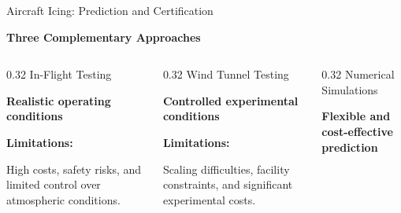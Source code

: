 \begin{frame}{Aircraft Icing: Prediction and Certification}

\vspace{-0.15cm}

\noindent{}

\vspace{0.05cm}
\vspace{0.25cm}
{\centering\color{champsBlue}\bfseries\large Three Complementary Approaches\par}
\vspace{0.1cm}

\vspace{-0.05cm}

\begin{columns}[T,onlytextwidth]

\begin{column}{0.32\textwidth}
\introCard
    {}
    {In-Flight Testing}
    {
    \textbf{Realistic operating conditions}

    \vspace{0.1cm}

    \textcolor{red!70!black}{\textbf{Limitations:}}

    High costs, safety risks, and
    limited control over atmospheric
    conditions.
    }
\end{column}

\begin{column}{0.32\textwidth}
\introCard
    {}
    {Wind Tunnel Testing}
    {
    \textbf{Controlled experimental conditions}

    \vspace{0.1cm}

    \textcolor{red!70!black}{\textbf{Limitations:}}

    Scaling difficulties, facility
    constraints, and significant
    experimental costs.
    }
\end{column}

\begin{column}{0.32\textwidth}
\introCard
    {}
    {Numerical Simulations}
    {
    \textbf{Flexible and cost-effective prediction}

}
\end{column}
\end{columns}
\end{frame}
